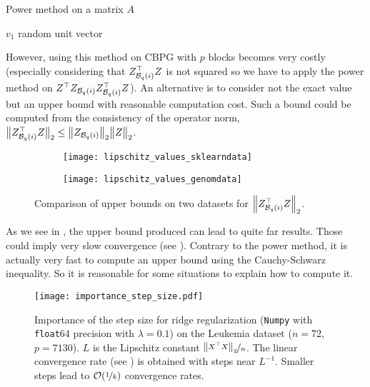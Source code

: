 \documentclass[../main.tex]{subfiles}
\begin{document}
\begin{algorithm}[H]
	\label{algo:pm}
	\caption{Power method on a matrix $A$}

	$v_1$ random unit vector


\end{algorithm}

However, using this method on CBPG with $p$ blocks becomes very costly
(especially considering that $Z_{\mathcal{B}_{q}(i)}^\top Z$ is not squared so we
have to apply the power method on $Z^\top Z_{\mathcal{B}_{q}(i)}Z_{\mathcal{B}_{q}(i)}^\top Z$).
An alternative is to consider not the exact value but an upper bound with
reasonable computation cost.
Such a bound could be computed from the consistency of the operator norm,
\ie $\big \lVert Z_{\mathcal{B}_{q}(i)}^\top Z \big \rVert_2 \leq \big \lVert Z_{\mathcal{B}_{q}(i)} \big \rVert_2 \big \lVert Z \big \rVert_2$.

\begin{figure}[ht]
	\begin{subfigure}{.47\textwidth}
		\centering
		\texttt{[image: lipschitz\_values\_sklearndata]}
	\end{subfigure} \hfill
	\begin{subfigure}{.47\textwidth}
		\centering
		\texttt{[image: lipschitz\_values\_genomdata]}
	\end{subfigure}
	\caption{Comparison of upper bounds on two datasets for
	$\left \lVert Z_{\mathcal{B}_{q}(i)}^\top Z \right \rVert_2$.}
	\label{fig:lip_values}
\end{figure}

As we see in , the upper bound produced can lead to quite
far results.
Those could imply very slow convergence (see ).
Contrary to the power method, it is actually very fast to compute
an upper bound using the Cauchy-Schwarz inequality.
So it is reasonable for some situations to explain how to compute it.
\begin{figure}[h]
	\centering
	\texttt{[image: importance\_step\_size.pdf]}
	\caption{
	Importance of the step size for ridge regularization (\texttt{Numpy}
	with \texttt{float}$64$ precision with $\lambda = 0.1$)
	on the Leukemia dataset ($n=72$, $p=7130$).
	$L$ is the Lipschitz constant $\nicefrac{\left \lVert X^\top X \right \rVert_2}{n}$.
	The linear convergence rate (see ) is obtained with steps
	near $L^{-1}$.
	Smaller steps lead to $\mathcal{O}(\nicefrac{1}{k})$ convergence rates.
	}
	\label{fig:importance_stepsize}
\end{figure}
\end{document}
